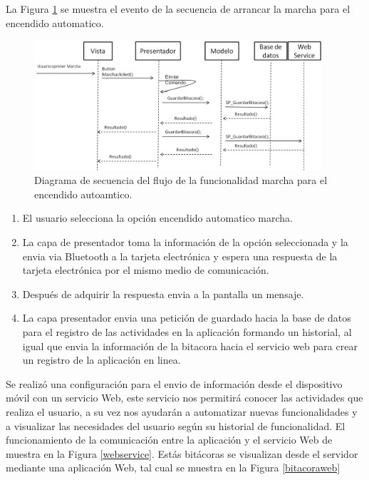 La Figura \ref{ds12} se muestra el evento de la secuencia de arrancar la marcha para el encendido automatico.\\
\begin{figure}[H]
\centering
\includegraphics[width=0.95\textwidth]{metodologia/DSMarcha.jpg}
\caption{Diagrama de secuencia del flujo de la funcionalidad marcha para el encendido autoamtico.}
\label{ds12}
\end{figure}
%
 \begin{enumerate}
\item El usuario selecciona la opción encendido automatico marcha.
\item La capa de presentador toma la información de la opción seleccionada y la envia via Bluetooth a la tarjeta electrónica y espera una respuesta de la tarjeta electrónica por el mismo medio de comunicación.
\item Después de adquirir la respuesta envia a la pantalla un mensaje.
\item La capa presentador envia una petición de guardado hacia la base de datos para el registro de las actividades en la aplicación formando un historial, al igual que envia la información de la bitacora hacia el servicio web para crear un registro de la aplicación en linea.
\end{enumerate}

Se realizó una configuración para el envio de información desde el dispositivo móvil con un servicio Web, este servicio nos permitirá conocer las actividades que realiza el usuario, a su vez nos ayudarán a automatizar nuevas funcionalidades y a visualizar las necesidades del usuario según su historial de funcionalidad. El funcionamiento de la comunicación entre la aplicación y el servicio Web de muestra en la Figura \ref{webservice}. Estás bitácoras se visualizan desde el servidor mediante una aplicación Web, tal cual se muestra en la Figura \ref{bitacoraweb}


